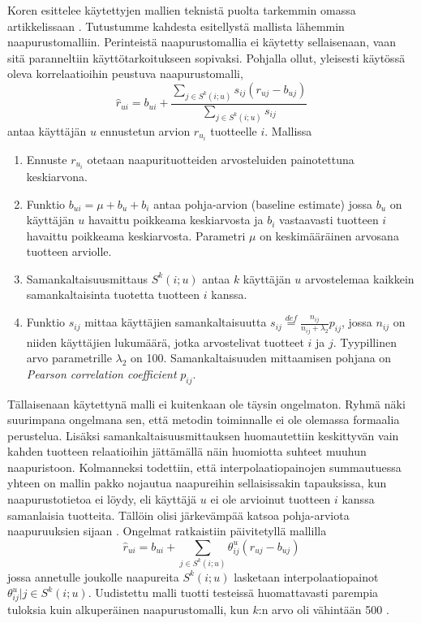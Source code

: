 \documentclass[12pt,finnish]{tktltiki2}
\theoremstyle{definition}
\theoremstyle{remark}
\begin{document}
	Koren esittelee käytettyjen mallien teknistä puolta tarkemmin omassa artikkelissaan \cite{Koren:2008:FMN:1401890.1401944}. Tutustumme kahdesta esitellystä mallista lähemmin naapurustomalliin. Perinteistä naapurustomallia ei käytetty sellaisenaan, vaan sitä paranneltiin käyttötarkoitukseen sopivaksi. Pohjalla ollut, yleisesti käytössä oleva korrelaatioihin peustuva naapurustomalli,
\begin{displaymath}
\hat{r}_{ui} = b_{ui} + \frac{\sum_{j\in S^{k}(i;u)} s_{ij}(r_{uj}-b_{uj})}{\sum_{j \in S^{k} (i;u)}s_{ij} }
\end{displaymath}         
antaa käyttäjän $u$ ennustetun arvion $r_{u_{i}}$ tuotteelle $i$. Mallissa
\begin{enumerate}
\item Ennuste $r_{u_{i}}$ otetaan naapurituotteiden arvosteluiden painotettuna keskiarvona.
\item Funktio $b_{ui} = \mu + b_u + b_i$ antaa pohja-arvion (baseline estimate) jossa $b_u$ on käyttäjän $u$ havaittu poikkeama keskiarvosta ja $b_i$ vastaavasti tuotteen $i$ havaittu poikkeama keskiarvosta. Parametri $\mu$ on keskimääräinen arvosana tuotteen arviolle.
\item Samankaltaisuusmittaus $S^k (i;u)$ antaa $k$ käyttäjän $u$ arvostelemaa kaikkein samankaltaisinta tuotetta tuotteen $i$ kanssa.
\item Funktio $s_{ij}$ mittaa käyttäjien samankaltaisuutta $s_{ij} \stackrel{def}{=} \frac{n_{ij}}{n_{ij} + \lambda_2} p_{ij}$, jossa $n_{ij}$ on niiden käyttäjien lukumäärä, jotka arvostelivat tuotteet $i$ ja $j$. Tyypillinen arvo parametrille $\lambda_2$ on 100. Samankaltaisuuden mittaamisen pohjana on \textit{Pearson correlation coefficient} $p_{ij}$.
\end{enumerate} 

Tällaisenaan käytettynä malli ei kuitenkaan ole täysin ongelmaton. Ryhmä näki suurimpana ongelmana sen, että metodin toiminnalle ei ole olemassa formaalia perustelua. Lisäksi samankaltaisuusmittauksen huomautettiin keskittyvän vain kahden tuotteen relaatioihin jättämällä näin huomiotta suhteet muuhun naapuristoon. Kolmanneksi todettiin, että interpolaatiopainojen summautuessa yhteen on mallin pakko nojautua naapureihin sellaisissakin tapauksissa, kun naapurustotietoa ei löydy, eli käyttäjä $u$ ei ole arvioinut tuotteen $i$ kanssa samanlaisia tuotteita. Tällöin olisi järkevämpää katsoa pohja-arviota naapuruuksien sijaan \cite{Koren:2008:FMN:1401890.1401944}.
Ongelmat ratkaistiin päivitetyllä mallilla
\begin{displaymath}
\hat{r}_{ui} = b_{ui} + \sum_{j\in{S^{k}} (i;u)}\theta^{u}_{ij}(r_{uj}-b_{uj})
\end{displaymath}
jossa annetulle joukolle naapureita $S^{k}(i;u)$ lasketaan interpolaatiopainot $\theta^{u}_{ij}|j \in S^{k}(i;u)$. Uudistettu malli tuotti testeissä huomattavasti parempia tuloksia kuin alkuperäinen naapurustomalli, kun $k$:n arvo oli vähintään 500 \cite{Koren:2008:FMN:1401890.1401944}.
        
\end{document}

